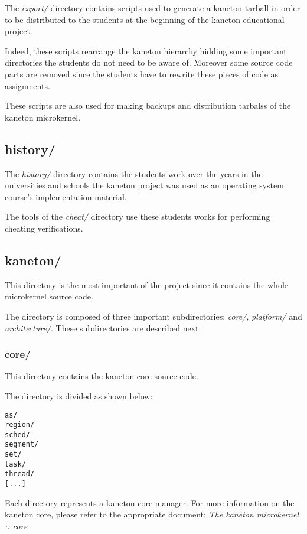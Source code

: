 The \textit{export/} directory contains scripts used to generate a kaneton
tarball in order to be distributed to the students at the beginning of the
kaneton educational project.

Indeed, these scripts rearrange the kaneton hierarchy hidding some important
directories the students do not need to be aware of. Moreover some source
code parts are removed since the students have to rewrite these pieces
of code as assignments.

These scripts are also used for making backups and distribution tarbalss of
the kaneton microkernel.

%
%

\subsection*{history/}

The \textit{history/} directory contains the students work over the years
in the universities and schools the kaneton project was used as an operating
system course's implementation material.

The tools of the \textit{cheat/} directory use these students works for
performing cheating verifications.

%
%

\subsection*{kaneton/}

This directory is the most important of the project since it contains
the whole microkernel source code.

The directory is composed of three important subdirectories: \textit{core/},
\textit{platform/} and \textit{architecture/}. These subdirectories are
described next.


\subsubsection*{core/}

This directory contains the kaneton core source code.

The directory is divided as shown below:

\begin{verbatim}
as/
region/
sched/
segment/
set/
task/
thread/
[...]
\end{verbatim}

Each directory represents a kaneton core manager. For more information on
the kaneton core, please refer to the appropriate document:
\textit{The kaneton microkernel :: core}

